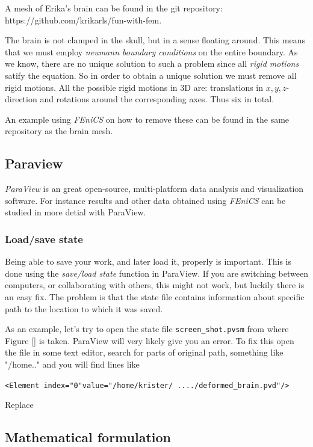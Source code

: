 \documentclass[epsfig,11pt]{article}
\begin{document}
A mesh of Erika's brain can be found in the git repository:
 https://github.com/krikarls/fun-with-fem. 
 

The brain is not clamped in the skull, but in a sense floating around. This means that we must employ \emph{neumann boundary conditions} on the entire boundary. As we know, there are no unique solution to such a problem since all \emph{rigid motions} satify the equation. So in order to obtain a unique solution we must remove all rigid motions. All the possible rigid motions in 3D are: translations in $x,y,z$-direction and rotations around the corresponding axes. Thus six in total.

An example using \emph{FEniCS} on how to remove these can be found in the same repository as the brain mesh. 

\subsection{Paraview}
\emph{ParaView} is an great open-source, multi-platform data analysis and visualization software. For instance results and other data obtained using \emph{FEniCS} can be studied in more detial with ParaView.  

\subsubsection{Load/save state}

Being able to save your work, and later load it, properly is important. This is done using the \emph{save/load state} function in ParaView. If you are switching between computers, or collaborating with others, this might not work, but luckily there is an easy fix. The problem is that the state file contains information about specific path to the location to which it was saved. 

As an example, let's try to open the state file  \texttt{screen\_shot.pvsm} from where Figure [] is taken. ParaView will very likely give you an error. To fix this open the file in some text editor, search for parts of original path, something like "/home.." and you will find lines like 

\texttt{<Element index="0"value="/home/krister/ ..../deformed\_brain.pvd"/>}

Replace 


\subsection{Mathematical formulation}
\end{document}
